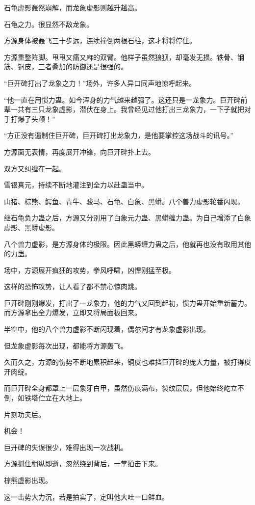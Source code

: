 \begin{this_body}
石龟虚影轰然崩解，而龙象虚影则越升越高。

石龟之力。很显然不敌龙象。

方源身体被轰飞三十步远，连续撞倒两根石柱，这才将将停住。

方源重整阵脚。甩甩又痛又麻的双臂。他样子虽然狼狈，却毫发无损。铁骨、钢筋、铜皮，三者叠加的防御还是很强的。

“巨开碑打出了龙象之力！”场外，许多人异口同声地惊呼起来。

“他一直在用惯力蛊。如今浑身的力气越来越强了。这还只是一龙象力。巨开碑前辈一共有三只龙象虚影，潜伏在身上。我曾经见过他打出三龙象力，一下子就把对手打爆了头颅！”

“方正没有遏制住巨开碑，巨开碑打出龙象力，是他要掌控这场战斗的讯号。”

方源面无表情，再度展开冲锋，向巨开碑扑上去。

双方又纠缠在一起。

雪银真元，持续不断地灌注到全力以赴蛊当中。

山猪、棕熊、鳄鱼、青牛、骏马、石龟、白象、黑蟒。八个兽力虚影轮番闪现。

继石龟负力蛊之后，方源又分别用了白象元力蛊、黑蟒缠力蛊。为自己增添了白象虚影、黑蟒虚影。

八个兽力虚影，是方源身体的极限。因此黑蟒缠力蛊之后，他就再也没有取用其他的力蛊。

场中，方源展开疯狂的攻势，拳风呼啸，凶悍刚猛至极。

这样的恐怖攻势，让人看了都不禁心惊肉跳。

巨开碑刚刚爆发，打出了一龙象力，他的力气又回到起初，惯力蛊开始重新蓄力。而方源拿出全力爆发，立即又将局面板回来。

半空中，他的八个兽力虚影不断闪现着，偶尔间才有龙象虚影出现。

但龙象虚影每次出现，都能将方源轰飞。

久而久之，方源的伤势不断地累积起来，铜皮也难挡巨开碑的庞大力量，被打得皮开肉绽。

而巨开碑全身都罩上一层象牙白甲，虽然伤痕满布，裂纹层层，但他始终屹立不倒，如铁塔伫立在大地上。

片刻功夫后。

机会！

巨开碑的失误很少，难得出现一次战机。

方源抓住稍纵即逝，忽然绕到背后，一掌拍击下来。

棕熊虚影出现。

这一击势大力沉，若是拍实了，定叫他大吐一口鲜血。


\end{this_body}
